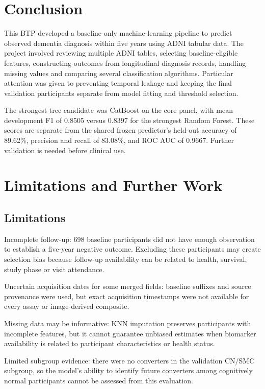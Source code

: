 \documentclass[11pt,a4paper]{article}
\begin{document}
\section{Conclusion}
This BTP developed a baseline-only machine-learning pipeline to predict observed dementia diagnosis within five years using ADNI tabular data. The project involved reviewing multiple ADNI tables, selecting baseline-eligible features, constructing outcomes from longitudinal diagnosis records, handling missing values and comparing several classification algorithms. Particular attention was given to preventing temporal leakage and keeping the final validation participants separate from model fitting and threshold selection.

The strongest tree candidate was CatBoost on the core panel, with mean development F1 of 0.8505 versus 0.8397 for the strongest Random Forest. These scores are separate from the shared frozen predictor's held-out accuracy of 89.62\%, precision and recall of 83.08\%, and ROC AUC of 0.9667. Further validation is needed before clinical use.

\section{Limitations and Further Work}
\subsection{Limitations}
Incomplete follow-up: 698 baseline participants did not have enough observation to establish a five-year negative outcome. Excluding these participants may create selection bias because follow-up availability can be related to health, survival, study phase or visit attendance.

Uncertain acquisition dates for some merged fields: baseline suffixes and source provenance were used, but exact acquisition timestamps were not available for every assay or image-derived composite.

Missing data may be informative: KNN imputation preserves participants with incomplete features, but it cannot guarantee unbiased estimates when biomarker availability is related to participant characteristics or health status.

Limited subgroup evidence: there were no converters in the validation CN/SMC subgroup, so the model's ability to identify future converters among cognitively normal participants cannot be assessed from this evaluation.
\end{document}
